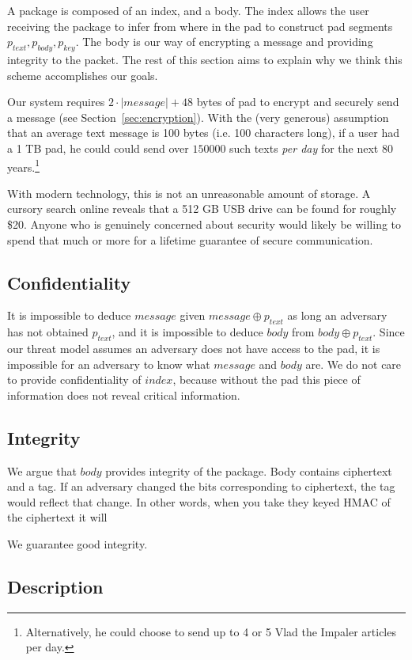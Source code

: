 \documentclass[twocolumn]{article}
\begin{document}
A package is composed of an index, and a body. The index allows the user receiving the package to infer from where in the pad to construct pad segments $p_{text}, p_{body}, p_{key}$. The body is our way of encrypting a message and providing integrity to the packet. The rest of this section aims to explain why we think this scheme accomplishes our goals.  

Our system requires $2\cdot |message| + 48$ bytes of pad to encrypt and securely send a message (see Section~\ref{sec:encryption}). With the (very generous) assumption that an average text message is 100 bytes (i.e. 100 characters long), if a user had a 1 TB pad, he could could send over $150000$ such texts \emph{per day} for the next 80 years.\footnote{
Alternatively, he could choose to send up to 4 or 5 Vlad the Impaler articles per day.
}

With modern technology, this is not an unreasonable amount of storage. A cursory search online reveals that a 512 GB USB drive can be found for roughly \$20. Anyone who is genuinely concerned about security would likely be willing to spend that much or more for a lifetime guarantee of secure communication.

\subsection{Confidentiality}
It is impossible to deduce $message$ given $message \oplus p_{text}$
as long an adversary has not obtained $p_{text}$, and it is impossible to deduce $body$ from $body \oplus p_{text}$. Since our threat model assumes an adversary does not have access to the pad, it is impossible for an adversary to know what $message$ and $body$ are. We do not care to provide confidentiality of $index$, because without the pad this piece of information does not reveal critical information. 

\subsection{Integrity}
We argue that $body$ provides integrity of the package. Body contains ciphertext and a tag. If an adversary changed the bits corresponding to ciphertext, the tag would reflect that change. In other words, when you take they keyed HMAC of the ciphertext it will 

We guarantee good integrity.

\subsection{Description}
\end{document}
